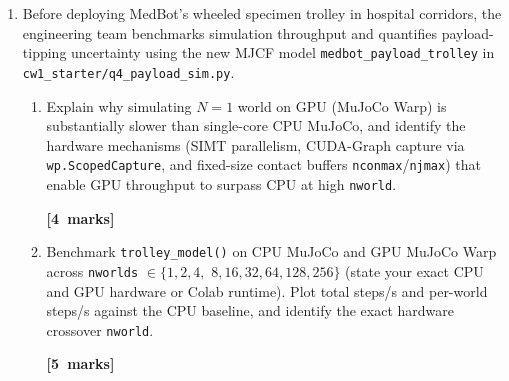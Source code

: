 \documentclass[11pt,a4paper]{article}
\newcommand{\qmarks}[1]{\par\nopagebreak\noindent\hfill\mbox{\textbf{[#1 marks]}}}
\newcommand{\qtotal}[1]{\par\smallskip\noindent\hfill\textbf{[Total #1 marks]}\par\medskip}
\begin{document}
\begin{enumerate}[label=\textbf{\arabic*.}, leftmargin=1.5em, itemsep=0.6em]
\begin{enumerate}[label=\textbf{\alph*.}, leftmargin=1.6em, itemsep=0.45em]
    \item Complete \texttt{cbf\_safety\_shield} in \texttt{q3\_sterile\_arm.py} to project nominal continuous velocities $u_{\mathrm{nom}}$ so that \textbf{both} constraints hold: (i)~joint-angle limits $q_{\min} \le q + u\,\Delta t \le q_{\max}$ and (ii)~the circular centrifuge barrier $h_{\mathrm{obs}}(q) = \|\mathrm{FK}(q) - c_{\mathrm{obs}}\|_2^2 - r_{\mathrm{obs}}^2 \ge 0$ via the discrete-time CBF condition $\nabla h_{\mathrm{obs}}(q)^\top u\,\Delta t + \alpha_{\mathrm{obs}} h_{\mathrm{obs}}(q) \ge 0$ using \texttt{jacobian(q)}. Also implement a \textbf{soft-penalty A2C baseline} (negative reward on limit or obstacle hits, without the shield). Explain your implementation. \qmarks{6}

    \item Compare three continuous A2C configurations on \texttt{SterileArmEnv(mode="continuous")} over 500 episodes (3 seeds): (i)~Unshielded A2C, (ii)~Soft-Penalty A2C, and (iii)~Dual-Barrier CBF-Shielded A2C. Evaluate mean return, cumulative joint-limit violations, and cumulative centrifuge collisions. Explain the \textit{limit-parking} pathology and why soft penalties cannot guarantee zero collisions during exploration whereas the CBF shield does. \qmarks{8}
\end{enumerate}
\qtotal{32}

\item Before deploying MedBot's wheeled specimen trolley in hospital corridors, the engineering team benchmarks simulation throughput and quantifies payload-tipping uncertainty using the new MJCF model \texttt{medbot\_payload\_trolley} in \texttt{cw1\_starter/q4\_payload\_sim.py}.
\begin{enumerate}[label=\textbf{\alph*.}, leftmargin=1.6em, itemsep=0.45em]
    \item Explain why simulating $N = 1$ world on GPU (MuJoCo Warp) is substantially slower than single-core CPU MuJoCo, and identify the hardware mechanisms (SIMT parallelism, CUDA-Graph capture via \texttt{wp.ScopedCapture}, and fixed-size contact buffers \texttt{nconmax}/\texttt{njmax}) that enable GPU throughput to surpass CPU at high \texttt{nworld}. \qmarks{4}

    \item Benchmark \texttt{trolley\_model()} on CPU MuJoCo and GPU MuJoCo Warp across \texttt{nworlds} $\in \{1, 2, 4,$ $8, 16, 32, 64, 128, 256\}$ (state your exact CPU and GPU hardware or Colab runtime). Plot total steps/s and per-world steps/s against the CPU baseline, and identify the exact hardware crossover \texttt{nworld}. \qmarks{5}


\end{enumerate}
\end{enumerate}
\end{document}
